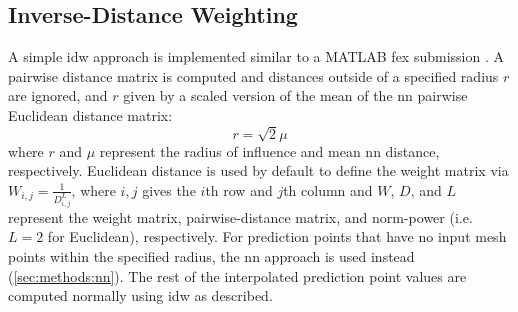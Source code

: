 \documentclass[preprint,12pt]{elsarticle}
\begin{document}

\subsection{Inverse-Distance Weighting} \label{sec:methods:idw}

A simple \gls{idw} approach is implemented similar to a MATLAB \gls{fex} submission \cite{tovarInverseDistanceWeight2020}. A pairwise distance matrix is computed and distances outside of a specified radius $r$ are ignored, and $r$ given by a scaled version of the mean of the \gls{nn} pairwise Euclidean distance matrix: 
\begin{equation}
r=\sqrt{2} \mu
\end{equation}
where $r$ and $\mu$ represent the radius of influence and mean \gls{nn} distance, respectively. Euclidean distance is used by default to define the weight matrix via $W_{i,j} = \frac{1}{D_{i,j}^L}$, where $i,j$ gives the $i$th row and $j$th column and $W$, $D$, and $L$ represent the weight matrix, pairwise-distance matrix, and norm-power (i.e. $L = 2$ for Euclidean), respectively. For prediction points that have no input mesh points within the specified radius, the \gls{nn} approach is used instead (\cref{sec:methods:nn}). The rest of the interpolated prediction point values are computed normally using \gls{idw} as described.
\end{document}
